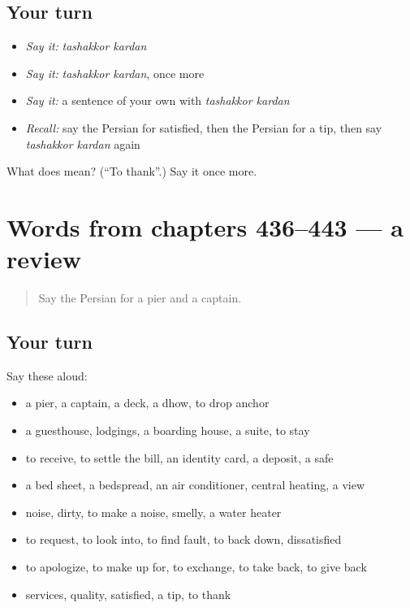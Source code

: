 \subsection*{Your turn}
\begin{itemize}
\raggedright
  \item \emph{Say it:} \emph{tashakkor kardan}
  \item \emph{Say it:} \emph{tashakkor kardan}, once more
  \item \emph{Say it:} a sentence of your own with \emph{tashakkor kardan}
  \item \emph{Recall:} say the Persian for satisfied, then the Persian for a tip, then say \emph{tashakkor kardan} again
\end{itemize}

\begin{tcolorbox}[breakable,colback=teal!4,colframe=teal!35!black,title={Before you move on}]
What does   mean? (\textquotedblleft{}To thank\textquotedblright{}.) Say it once more.
\end{tcolorbox}
\section[(dialogue)]{Words from chapters 436–443 — a review}

\label{lesson:FA-R443-review-436-443}



\begin{quote}
Say the Persian for a pier and a captain.
\end{quote}

\subsection*{Your turn}
Say these aloud:

\begin{itemize}
\raggedright
  \item a pier, a captain, a deck, a dhow, to drop anchor
  \item a guesthouse, lodgings, a boarding house, a suite, to stay
  \item to receive, to settle the bill, an identity card, a deposit, a safe
  \item a bed sheet, a bedspread, an air conditioner, central heating, a view
  \item noise, dirty, to make a noise, smelly, a water heater
  \item to request, to look into, to find fault, to back down, dissatisfied
  \item to apologize, to make up for, to exchange, to take back, to give back
  \item services, quality, satisfied, a tip, to thank
\end{itemize}

